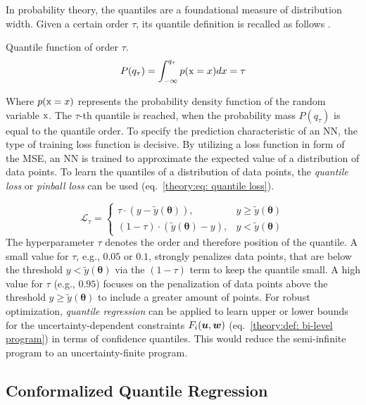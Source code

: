 In probability theory, the quantiles are a foundational measure of distribution width. Given a certain 
order $\tau$, its quantile definition is recalled as follows \cite{lange2017}.
\begin{definition} Quantile function of order $\tau$.
    \label{theory:def:quantile}
    \[
    P(q_\tau) = \int_{-\infty}^{q_\tau} p({\textnormal{x}} = x) dx = \tau
    \]
\end{definition}
\noindent
Where $p({\textnormal{x}} = x)$ represents the probability density function of the random variable ${\textnormal{x}}$. The
$\tau$-th quantile is reached, when the probability mass $P(q_\tau)$ is equal to the quantile order.
To specify the prediction characteristic of an NN, the type of training loss function is decisive.
By utilizing a loss function in form of the MSE, an NN is trained to approximate the expected value of a distribution of data points.
To learn the quantiles of a distribution of data points, the \emph{quantile loss} or \emph{pinball loss} can be used (eq.~\ref{theory:eq: quantile loss}).

\begin{equation}
    \label{theory:eq: quantile loss}
    \mathcal{L}_\tau = 
    \begin{cases}
        \tau \cdot (y - \tilde{y}(\bm{\theta})), & y \geq \tilde{y}(\bm{\theta}) \\
        (1 - \tau) \cdot (\tilde{y}(\bm{\theta}) - y), &y < \tilde{y}(\bm{\theta})
    \end{cases}
\end{equation}
\noindent
The hyperparameter $\tau$ denotes the order and therefore position of the quantile. A small value for $\tau$, e.g.,
$0.05$ or $0.1$, strongly penalizes data points, that are below the threshold $y < \tilde{y}(\bm{\theta})$ via the $(1-\tau)$ term
to keep the quantile small. A high value for $\tau$ (e.g., $0.95$) focuses on the penalization of data points above
the threshold $y \geq \tilde{y}(\bm{\theta})$ to include a greater amount of points.
For robust optimization, \emph{quantile regression} can be applied to learn upper or lower bounds for the uncertainty-dependent
constraints $F_i({\bm{u}}, {\bm{w}})$ (eq.~\ref{theory:def: bi-level program}) in terms of confidence quantiles. This would reduce
the semi-infinite program to an uncertainty-finite program.

\subsection{Conformalized Quantile Regression}
\label{theory: CQR}

